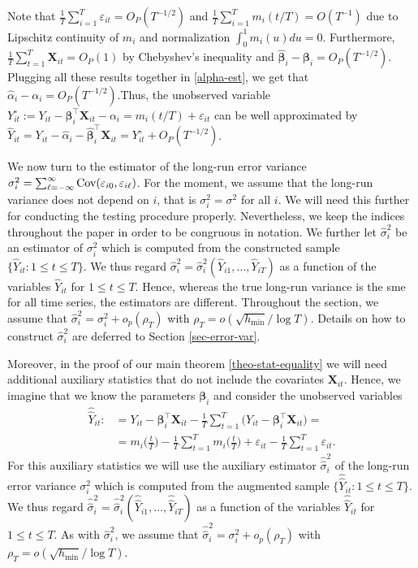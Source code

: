 \documentclass[a4paper,12pt]{article}
\newcommand{\doublehattwo}[1]{\widehat{\widehat{#1}}}
\begin{document}
Note that $\frac{1}{T}\sum_{i=1}^T \varepsilon_{it} = O_P(T^{-1/2})$ and $\frac{1}{T}\sum_{i=1}^T m_i(t/T) = O(T^{-1})$ due to Lipschitz continuity of $m_i$ and normalization $\int_{0}^1 m_i(u)du = 0$. Furthermore, $\frac{1}{T}\sum_{t=1}^T  \mathbf{X}_{it} = O_P(1)$ by Chebyshev's inequality and $\widehat{\bm{\beta}}_i - \bm{\beta}_i = O_P (T^{-1/2})$. Plugging all these results together in \eqref{alpha-est}, we get that $\widehat{\alpha}_i - \alpha_i = O_P(T^{-1/2})$.Thus, the unobserved variable $Y_{it}^\circ := Y_{it} - \bm{\beta}_i^\top \mathbf{X}_{it} - \alpha_i = m_i(t/T) + \varepsilon_{it}$ can be well approximated by $\widehat{Y}_{it} = Y_{it} -\widehat{\alpha}_i - \widehat{\bm{\beta}}_i^\top \mathbf{X}_{it} = Y_{it}^\circ + O_P(T^{-1/2})$.

We now turn to the estimator of the long-run error variance $\sigma_i^2 = \sum\nolimits_{\ell=-\infty}^{\infty} \textnormal{Cov}(\varepsilon_{i0}, \varepsilon_{i\ell})$. For the moment, we assume that the long-run variance does not depend on $i$, that is $\sigma_i^2 = \sigma^2$ for all $i$. We will need this further for conducting the testing procedure properly. Nevertheless, we keep the indices throughout the paper in order to be congruous in notation. We further let $\widehat{\sigma}_i^2$ be an estimator of $\sigma_i^2$ which is computed from the constructed sample $\{ \widehat{Y}_{it}: 1 \le t \le T \}$. We thus regard $\widehat{\sigma}_i^2 = \widehat{\sigma}_i^2(\widehat{Y}_{i1},\ldots,\widehat{Y}_{iT})$ as a function of the variables $\widehat{Y}_{it}$ for $1 \le t \le T$. Hence, whereas the true long-run variance is the sme for all time series, the estimators are different. Throughout the section, we assume that $\widehat{\sigma}_i^2 = \sigma_i^2 + o_p(\rho_T)$ with $\rho_T = o(\sqrt{h_{\min}}/\log T)$. Details on how to construct $\widehat{\sigma}_i^2$ are deferred to Section \ref{sec-error-var}. 

Moreover, in the proof of our main theorem \ref{theo-stat-equality} we will need additional auxiliary statistics that do not include the covariates $\mathbf{X}_{it}$. Hence, we imagine that we know the parameters $\bm{\beta}_i$ and consider the unobserved variables 
\begin{align*}
\doublehattwo{Y}_{it} :&= Y_{it} - \bm{\beta}_i^\top \mathbf{X}_{it} -  \frac{1}{T}\sum_{t=1}^T \big(Y_{it} - \bm{\beta}_i^\top \mathbf{X}_{it}\big) =\\
&=m_i \Big( \frac{t}{T} \Big)  - \frac{1}{T}\sum_{t=1}^T  m_i \Big( \frac{t}{T} \Big) + \varepsilon_{it} - \frac{1}{T}\sum_{t=1}^T \varepsilon_{it}.
\end{align*}
For this auxiliary statistics we will use the auxiliary estimator $\doublehattwo{\sigma}_i^2$ of the long-run error variance $\sigma_i^2$ which is computed from the augmented sample $\{ \doublehattwo{Y}_{it}: 1 \le t \le T \}$. We thus regard $\doublehattwo{\sigma}_i^2 = \doublehattwo{\sigma}_i^2(\doublehattwo{Y}_{i1},\ldots,\doublehattwo{Y}_{iT})$ as a function of the variables $\doublehattwo{Y}_{it}$ for $1 \le t \le T$. As with $\widehat{\sigma}_i^2$, we assume that $\doublehattwo{\sigma}_i^2 = \sigma^2_i + o_p(\rho_T)$ with $\rho_T = o(\sqrt{h_{\min}}/\log T)$.
\end{document}
